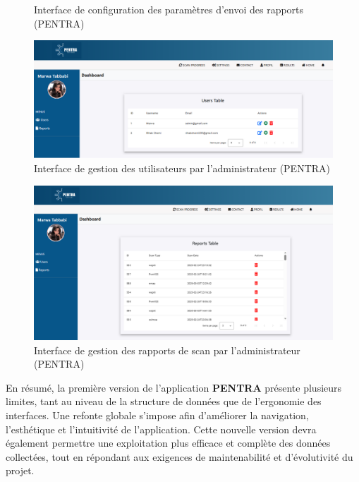 \begin{justify}
\begin{enumerate}
\begin{figure}[H]
            \caption{\centering Interface de configuration des paramètres d'envoi des rapports (PENTRA)}
            \label{fig:PENTRA-V1-10}
        \end{figure}
        \vspace{-0.8cm}
        \begin{figure}[H]
            \centering
            \includegraphics[width=0.8\linewidth]{Annexe/PENTRA-V1/14.png}
            \caption{\centering Interface de gestion des utilisateurs par l'administrateur (PENTRA)}
            \label{fig:PENTRA-V1-12}
        \end{figure}
         \vspace{-0.8cm}
        \begin{figure}[H]
            \centering
            \includegraphics[width=0.8\linewidth]{Annexe/PENTRA-V1/15.png}
            \caption{\centering Interface de gestion des rapports de scan par l'administrateur (PENTRA)}
            \label{fig:PENTRA-V1-13}
        \end{figure}
        \vspace{-0.3cm}
        \end{enumerate}
        En résumé, la première version de l'application \textbf{PENTRA} présente plusieurs limites, tant au niveau de la structure de données que de l’ergonomie des interfaces. Une refonte globale s’impose afin d’améliorer la navigation, l’esthétique et l’intuitivité de l’application. Cette nouvelle version devra également permettre une exploitation plus efficace et complète des données collectées, tout en répondant aux exigences de maintenabilité et d’évolutivité du projet.
 \end{justify}
